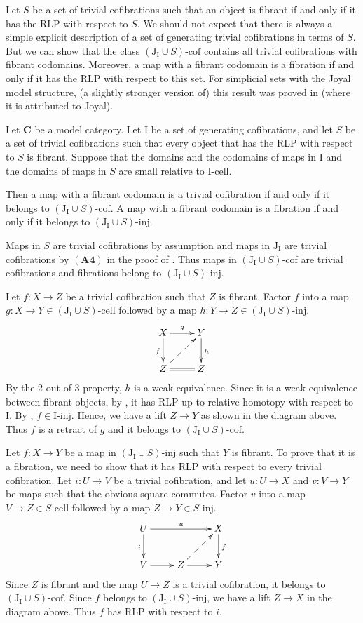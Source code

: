 \documentclass{tac}
\theoremstyle{definition}
\newcommand{\cat}[1]{\mathbf{#1}}
\newcommand{\C}{\cat{C}}
\newcommand{\I}{\mathrm{I}}
\newcommand{\J}{\mathrm{J}}
\newcommand{\class}[2]{#1\text{-}\mathrm{#2}}
\newcommand{\Iinj}[1][\I]{\class{#1}{inj}}
\newcommand{\Icell}[1][\I]{\class{#1}{cell}}
\newcommand{\Icof}[1][\I]{\class{#1}{cof}}
\begin{document}
Let $S$ be a set of trivial cofibrations such that an object is fibrant if and only if it has the RLP with respect to $S$.
We should not expect that there is always a simple explicit description of a set of generating trivial cofibrations in terms of $S$.
But we can show that the class $\Icof[(\J_\I \cup S)]$ contains all trivial cofibrations with fibrant codomains.
Moreover, a map with a fibrant codomain is a fibration if and only if it has the RLP with respect to this set.
For simplicial sets with the Joyal model structure, (a slightly stronger version of) this result was proved in \cite[Corollary~2.4.6.5]{lurie-topos} (where it is attributed to Joyal).

\begin{prop}
Let $\C$ be a model category.
Let $\I$ be a set of generating cofibrations, and let $S$ be a set of trivial cofibrations
such that every object that has the RLP with respect to $S$ is fibrant.
Suppose that the domains and the codomains of maps in $\I$ and the domains of maps in $S$ are small relative to $\Icell$.

Then a map with a fibrant codomain is a trivial cofibration if and only if it belongs to $\Icof[(\J_\I \cup S)]$.
A map with a fibrant codomain is a fibration if and only if it belongs to $\Iinj[(\J_\I \cup S)]$.
\end{prop}
\proof
Maps in $S$ are trivial cofibrations by assumption and maps in $\J_\I$ are trivial cofibrations by $\mathbf{(A4)}$ in the proof of .
Thus maps in $\Icof[(\J_\I \cup S)]$ are trivial cofibrations and fibrations belong to $\Iinj[(\J_\I \cup S)]$.

Let $f : X \to Z$ be a trivial cofibration such that $Z$ is fibrant.
Factor $f$ into a map $g : X \to Y \in \Icell[(\J_\I \cup S)]$ followed by a map $h : Y \to Z \in \Iinj[(\J_\I \cup S)]$.
\[ \xymatrix{ X \ar[r]^g \ar[d]_f & Y \ar[d]^h \\
              Z \ar@{=}[r] \ar@{-->}[ur] & Z
            } \]
By the 2-out-of-3 property, $h$ is a weak equivalence.
Since it is a weak equivalence between fibrant objects, by , it has RLP up to relative homotopy with respect to $\I$.
By , $f \in \Iinj$.
Hence, we have a lift $Z \to Y$ as shown in the diagram above.
Thus $f$ is a retract of $g$ and it belongs to $\Icof[(\J_\I \cup S)]$.

Let $f : X \to Y$ be a map in $\Iinj[(\J_\I \cup S)]$ such that $Y$ is fibrant.
To prove that it is a fibration, we need to show that it has RLP with respect to every trivial cofibration.
Let $i : U \to V$ be a trivial cofibration, and let $u : U \to X$ and $v : V \to Y$ be maps such that the obvious square commutes.
Factor $v$ into a map $V \to Z \in \Icell[S]$ followed by a map $Z \to Y \in \Iinj[S]$.
\[ \xymatrix{ U \ar[rr]^u \ar[d]_i & & X \ar[d]^f \\
              V \ar[r] & Z \ar[r] \ar@{-->}[ur] & Y
            } \]
Since $Z$ is fibrant and the map $U \to Z$ is a trivial cofibration, it belongs to $\Icof[(\J_\I \cup S)]$.
Since $f$ belongs to $\Iinj[(\J_\I \cup S)]$, we have a lift $Z \to X$ in the diagram above.
Thus $f$ has RLP with respect to $i$.
\endproof
\end{document}
